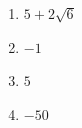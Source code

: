 %
%
    \begin{enumerate}[cols=2]
        \item $5+2\sqrt{6}$
        \item $-1$
        \item $5$
        \item $-50$
    \end{enumerate}
